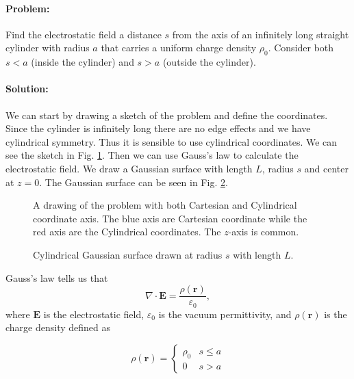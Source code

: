\paragraph{Problem:} Find the electrostatic field a distance $s$ from the axis of an infinitely long straight cylinder with radius $a$ that carries a uniform charge density $\rho_0$. Consider both $s < a$ (inside the cylinder) and $s > a$ (outside the cylinder).

\paragraph{Solution:} We can start by drawing a sketch of the problem and define the coordinates. Since the cylinder is infinitely long there are no edge effects and we have cylindrical symmetry. Thus it is sensible to use cylindrical coordinates. We can see the sketch in Fig. \ref{fig:sketch}. Then we can use Gauss's law to calculate the electrostatic field. We draw a Gaussian surface with length $L$, radius $s$ and center at $z=0$. The Gaussian surface can be seen in Fig. \ref{fig:gauss}.

\begin{figure}[H]
    \centering
    
    \caption{A drawing of the problem with both Cartesian and Cylindrical coordinate axis. The blue axis are Cartesian coordinate while the red axis are the Cylindrical coordinates. The $z$-axis is common.}\label{fig:sketch}
\end{figure}

\begin{figure}[H]
    \centering
    
    \caption{Cylindrical Gaussian surface drawn at radius $s$ with length $L$.}\label{fig:gauss}
\end{figure}

Gauss's law tells us that 
\begin{equation}
    \nabla \cdot \textbf{E} = \frac{\rho(\textbf{r})}{\varepsilon_0},
\end{equation}
where $\textbf{E}$ is the electrostatic field, $\varepsilon_0$ is the vacuum permittivity, and $\rho(\textbf{r})$ is the charge density defined as
\begin{singlespace}
\begin{equation}
    \rho(\mathbf{r}) = 
    \begin{cases}
        \rho_0 & s \leq a\\
        0 & s > a
    \end{cases}
\end{equation}
\end{singlespace}
